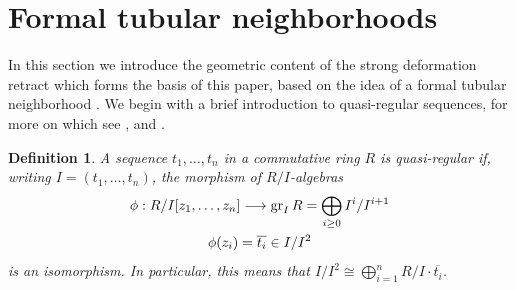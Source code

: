 \documentclass[english,letter paper,12pt,leqno]{article}
\theoremstyle{example}
\newtheorem{definition}[theorem]{Definition}
\newtheorem{remark}[theorem]{Remark}
\numberwithin{equation}{section}
\begin{document}



\appendix

\section{Formal tubular neighborhoods}\label{section:formaltub}

In this section we introduce the geometric content of the strong deformation retract which forms the basis of this paper, based on the idea of a formal tubular neighborhood \cite{cuntzquillen, lipman}. We begin with a brief introduction to quasi-regular sequences, for more on which see \cite[\S 15.B]{matsumura}, \cite[Chapitre $0$ \S 15.1]{EGA4} and \cite[Section\,10.68]{stacks_project}.

\begin{definition} A sequence $t_1,\ldots,t_n$ in a commutative ring $R$ is \emph{quasi-regular} if, writing $I = (t_1,\ldots,t_n)$, the morphism of $R/I$-algebras
\begin{gather*}
\phi: R/I[z_1,\ldots,z_n] \longrightarrow \operatorname{gr}_I R = \bigoplus_{i \ge 0} I^i / I^{i+1}\\
\phi(z_i) = \overline{t_i} \in I/I^2
\end{gather*}
is an isomorphism. In particular, this means that $I/I^2 \cong \bigoplus_{i=1}^n R/I \cdot \overline{t_i}$.
\end{definition}
\end{document}
